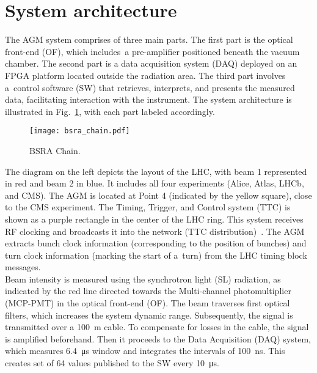 \section{System architecture}
The AGM system comprises of three main parts. The first part is the optical front-end
(OF), which includes~a pre-amplifier positioned beneath the vacuum chamber. The
second part is a data acquisition system (DAQ) deployed on an FPGA platform
located outside the radiation area. The third part involves a~control software (SW) that
retrieves, interprets, and presents the measured data, facilitating interaction
with the instrument. The system architecture is illustrated in
Fig.~\ref{fig:bsra_chain}, with each part labeled accordingly.
\begin{figure}[!tbh]
    \centering
    \texttt{[image: bsra\_chain.pdf]}
    \caption{BSRA Chain.}
    \label{fig:bsra_chain}
\end{figure} 
The diagram on the left depicts the layout of the LHC, with beam 1 represented
in red and beam 2 in blue. It includes all four experiments (Alice, Atlas,
LHCb, and CMS). The AGM is located at Point 4 (indicated by the yellow
square), close to the CMS experiment. The Timing, Trigger, and Control system
(TTC) is shown as a purple rectangle in the center of the LHC ring. This system
receives RF clocking and broadcasts it into the network (TTC
distribution)~\cite{ttc_distribution}. The AGM extracts bunch clock information
(corresponding to the position of bunches) and turn clock information (marking
the start of a~turn) from the LHC timing block messages.\\
Beam intensity is measured using the synchrotron light (SL) radiation, as indicated by the red line directed towards the Multi-channel photomultiplier
(MCP-PMT) in the optical front-end (OF). The beam traverses first optical
filters, which increases the system dynamic range. Subsequently, the signal is
transmitted over a \SI{100}{m} cable. To compensate for losses in the cable,
the signal is amplified beforehand. Then it proceeds to the Data Acquisition
(DAQ) system, which measures \SI{6.4}{\micro\second} window and integrates the
intervals of \SI{100}{\nano\second}. This creates set of 64 values published to
the SW every \SI{10}{\micro\second}.

